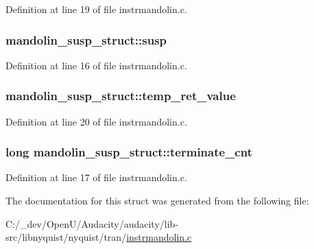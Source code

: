 Definition at line 19 of file instrmandolin.\+c.

\subsubsection[{\texorpdfstring{susp}{susp}}]{ mandolin\+\_\+susp\+\_\+struct\+::susp}\hypertarget{structmandolin__susp__struct_a0c2a1633b69d5490178ae12db72348e0}{}\label{structmandolin__susp__struct_a0c2a1633b69d5490178ae12db72348e0}


Definition at line 16 of file instrmandolin.\+c.

\subsubsection[{\texorpdfstring{temp\+\_\+ret\+\_\+value}{temp_ret_value}}]{ mandolin\+\_\+susp\+\_\+struct\+::temp\+\_\+ret\+\_\+value}\hypertarget{structmandolin__susp__struct_a8dbbb9cc86898df51706f0d8e4bc9578}{}\label{structmandolin__susp__struct_a8dbbb9cc86898df51706f0d8e4bc9578}


Definition at line 20 of file instrmandolin.\+c.

\subsubsection[{\texorpdfstring{terminate\+\_\+cnt}{terminate_cnt}}]{\setlength{\rightskip}{0pt plus 5cm}long mandolin\+\_\+susp\+\_\+struct\+::terminate\+\_\+cnt}\hypertarget{structmandolin__susp__struct_a1607d525abfe132301fa36afa75cad7a}{}\label{structmandolin__susp__struct_a1607d525abfe132301fa36afa75cad7a}


Definition at line 17 of file instrmandolin.\+c.



The documentation for this struct was generated from the following file\+:\begin{DoxyCompactItemize}
\item 
C\+:/\+\_\+dev/\+Open\+U/\+Audacity/audacity/lib-\/src/libnyquist/nyquist/tran/\hyperlink{instrmandolin_8c}{instrmandolin.\+c}\end{DoxyCompactItemize}
